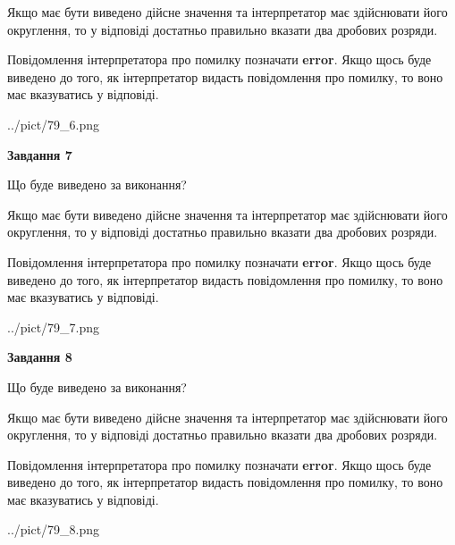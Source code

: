 \documentclass[12pt, ukrainian]{article}
\begin{document}
{\begin {Large}
Якщо має бути виведено дійсне значення та інтерпретатор має здійснювати його округлення, 
то у відповіді достатньо правильно вказати два дробових розряди.

Повідомлення інтерпретатора про помилку позначати \textbf{error}.
Якщо щось буде виведено до того, як інтерпретатор видасть повідомлення про помилку, 
то воно має вказуватись у відповіді. \par

\begin{center}
	{../pict/79_6.png}
\end{center}
\newpage

{\begin {center}\textbf{Завдання 7}\end {center}}\par
Що буде виведено за виконання? \par

Якщо має бути виведено дійсне значення та інтерпретатор має здійснювати його округлення, 
то у відповіді достатньо правильно вказати два дробових розряди.

Повідомлення інтерпретатора про помилку позначати \textbf{error}.
Якщо щось буде виведено до того, як інтерпретатор видасть повідомлення про помилку, 
то воно має вказуватись у відповіді. \par

\begin{center}
	{../pict/79_7.png}
\end{center}
\newpage

{\begin {center}\textbf{Завдання 8}\end {center}}\par
Що буде виведено за виконання? \par

Якщо має бути виведено дійсне значення та інтерпретатор має здійснювати його округлення, 
то у відповіді достатньо правильно вказати два дробових розряди.

Повідомлення інтерпретатора про помилку позначати \textbf{error}.
Якщо щось буде виведено до того, як інтерпретатор видасть повідомлення про помилку, 
то воно має вказуватись у відповіді. \par

\begin{center}
	{../pict/79_8.png}
\end{center}
\newpage


\end{Large}}
\end{document}

